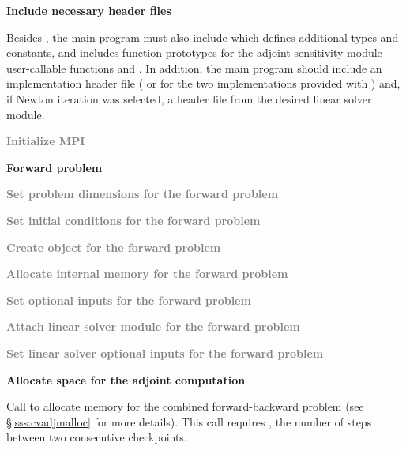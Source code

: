 \begin{Steps}

\item
  {\bf Include necessary header files}
  
  Besides , the main program must also include
   which defines additional types and constants, and includes
  function prototypes for the adjoint sensitivity module user-callable functions and
  . In addition, the main program should include an {\nvector} 
  implementation header file ( or 
  for the two implementations provided with {\cvodes}) and, if Newton iteration 
  was selected, a header file from the desired linear solver module.

\item
  \textcolor{gray}{\bf {\p} Initialize MPI}

  \vspace{0.2in}\centerline{\bf Forward problem}

\item
  \textcolor{gray}{\bf Set problem dimensions for the forward problem}

\item
  \textcolor{gray}{\bf Set initial conditions for the forward problem}

\item
  \textcolor{gray}{\bf Create {\cvodes} object for the forward problem}

\item
  \textcolor{gray}{\bf Allocate internal memory for the forward problem}

\item
  \textcolor{gray}{\bf Set optional inputs for the forward problem}

\item
  \textcolor{gray}{\bf Attach linear solver module for the forward problem}

\item
  \textcolor{gray}{\bf Set linear solver optional inputs for the forward problem}

\item
  {\bf Allocate space for the adjoint computation}

  Call \id{()} to allocate memory for the 
  combined forward-backward problem (see \S\ref{sss:cvadjmalloc} for more details). 
  This call requires , the number of steps between two consecutive checkpoints.


\end{Steps}
